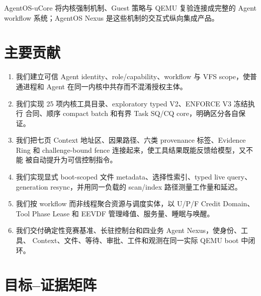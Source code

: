 \begin{designbox}[作品定位]
AgentOS-uCore 将内核强制机制、Guest 策略与 QEMU 复验连接成完整的 Agent workflow
系统；AgentOS Nexus 是这些机制的交互式纵向集成产品。
\end{designbox}

\section*{主要贡献}

\begin{enumerate}
  \item 我们建立可信 Agent identity、role/capability、workflow 
        与 VFS scope，使普通进程和 Agent 在同一内核中共存而不混淆授权主体。
  \item 我们实现 25 项内核工具目录、exploratory typed V2、ENFORCE V3 冻结执行
        合同、顺序 compact batch 和有界 Task SQ/CQ core，明确区分各自保证。
  \item 我们把七页 Context 地址区、因果路径、六类 provenance 标签、Evidence
        Ring 和 challenge-bound fence 连接起来，使工具结果既能反馈给模型，又不能
        被自动提升为可信控制指令。
  \item 我们实现显式 boot-scoped 文件 metadata、选择性索引、typed live query、
        generation resync，并用同一负载的 scan/index 路径测量工作量和延迟。
  \item 我们按 workflow 而非线程聚合资源与调度实体，以 U/P/F Credit Domain、
        Tool Phase Lease 和 EEVDF 管理峰值、服务量、睡眠与唤醒。
  \item 我们交付确定性竞赛基准、长驻控制台和四业务 Agent Nexus，使身份、工具、
        Context、文件、等待、审批、工件和观测在同一实际 QEMU boot 中闭环。
\end{enumerate}

\section*{目标--证据矩阵}

